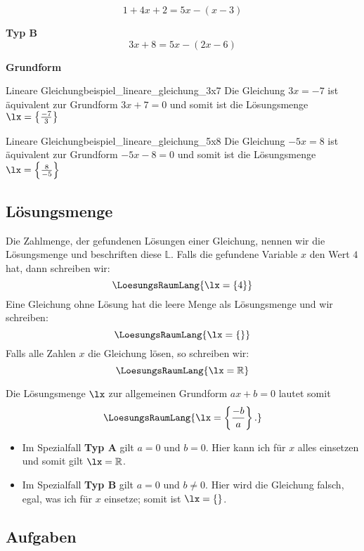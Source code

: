 $$1+4x+2 = 5x - (x-3)$$

\textbf{Typ B}\\

$$3x+8 = 5x-(2x-6)$$

\textbf{Grundform}\\

\begin{beispiel}{Lineare Gleichung}{beispiel_lineare_gleichung_3x7}
  Die Gleichung $3x=-7$ ist äquivalent zur Grundform $3x+7=0$ und somit ist die Lösungsmenge $\lx=\left\{ \frac{-7}{3}  \right\}$
  \end{beispiel}

\begin{beispiel}{Lineare Gleichung}{beispiel_lineare_gleichung_5x8}
  Die Gleichung $-5x=8$ ist äquivalent zur Grundform $-5x-8=0$ und somit ist die Lösungsmenge $\lx=\left\{ \frac{8}{-5}  \right\}$
\end{beispiel}
\newpage


\subsection{Lösungsmenge}
  Die Zahlmenge, der gefundenen Lösungen einer Gleichung, nennen wir
  die Lösungsmenge und beschriften diese $\mathbb{L}$. Falls die gefundene
  Variable $x$ \zB{} den Wert $4$ hat, dann schreiben wir:
  $$\LoesungsRaumLang{\lx=\{4\}}$$
  Eine Gleichung ohne Lösung hat die leere Menge als Lösungsmenge und
  wir schreiben:
  $$\LoesungsRaumLang{\lx=\{\}}$$
  Falls alle Zahlen $x$ die Gleichung lösen, so schreiben wir:
  $$\LoesungsRaumLang{\lx=\mathbb{R}}$$

  

Die Lösungsmenge $\lx$ zur allgemeinen Grundform $ax+b=0$ lautet somit $$\LoesungsRaumLang{\lx=\left\{ \frac{-b}{a} \right\}.}$$

\begin{itemize}
  \item Im Spezialfall \textbf{Typ A} gilt $a=0$ und $b=0$. Hier kann ich für $x$ alles einsetzen und somit gilt $\lx=\mathbb{R}$.
  \item Im Spezialfall \textbf{Typ B} gilt $a=0$ und $b\ne 0$. Hier wird die Gleichung falsch, egal, was ich für $x$ einsetze; somit ist $\lx=\{\}$.
\end{itemize}

\subsection*{Aufgaben}
\newpage

